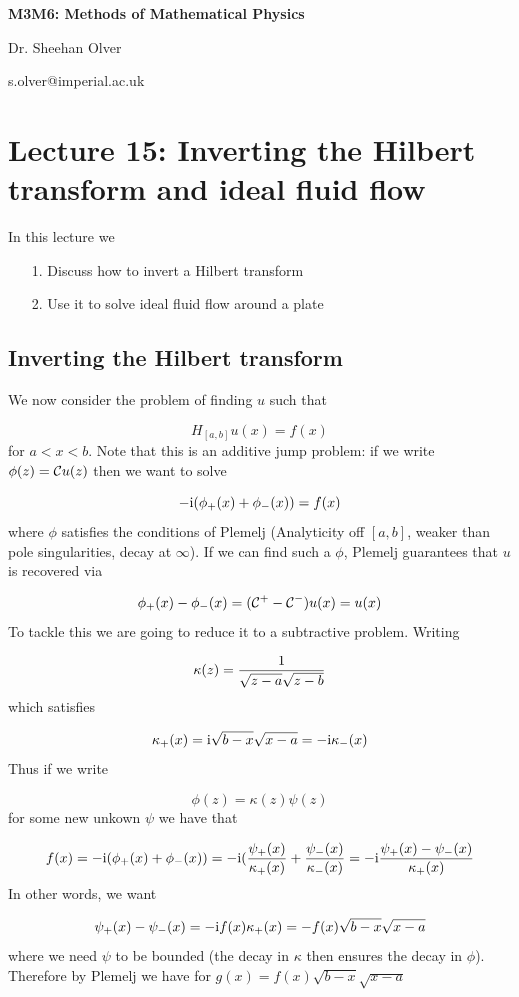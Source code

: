 \documentclass[12pt,a4paper]{article}
\def\I{ {\rm i} }
\def\CC{ {\cal C} }
\begin{document}
\textbf{M3M6: Methods of Mathematical Physics}

Dr. Sheehan Olver

s.olver@imperial.ac.uk

\section{Lecture 15: Inverting the Hilbert transform and ideal fluid flow}
In this lecture we

\begin{itemize}
\item[1. ] Discuss how to invert a Hilbert transform


\item[2. ] Use it to solve ideal fluid flow around a plate

\end{itemize}
\subsection{Inverting the Hilbert transform}
We now consider the problem of finding $u$ such that

\[
H_{[a,b]} u(x) = f(x)
\]
for $a < x < b$. Note that this is an additive jump problem: if we write $\phi(z) = \CC u(z)$ then we want to solve

\[
-\I (\phi_+(x) + \phi_-(x)) = f(x)
\]
where $\phi$ satisfies the conditions of Plemelj (Analyticity off $[a,b]$, weaker than pole singularities, decay at $\infty$).  If we can find such a $\phi$, Plemelj guarantees that $u$ is recovered via 

\[
\phi_+(x) - \phi_-(x) = (\CC^+ - \CC^-)u(x) = u(x)
\]
To tackle this we are going to reduce it to a subtractive problem. Writing 

\[
\kappa(z) = {1 \over \sqrt{z-a} \sqrt{z-b}}
\]
which satisfies 

\[
\kappa_+(x) = \I \sqrt{b-x} \sqrt{x-a} = - \I \kappa_-(x)
\]
Thus if we write

\[
\phi(z) = \kappa(z) \psi(z)
\]
for some new unkown $\psi$ we have that

\[
f(x) = -\I (\phi_+(x) + \phi_-(x)) = -\I ({\psi_+(x) \over \kappa_+(x)} + {\psi_-(x) \over \kappa_-(x)} = 
-\I {\psi_+(x) - \psi_-(x) \over \kappa_+(x)}
\]
In other words, we want

\[
\psi_+(x) - \psi_-(x) = - \I f(x) \kappa_+(x) = -f(x)\sqrt{b-x}\sqrt{x-a}
\]
where we need $\psi$ to be bounded (the decay in $\kappa$ then ensures the decay in $\phi$).  Therefore by Plemelj we have for $g(x) = f(x) \sqrt{b-x} \sqrt{x-a}$
\end{document}
